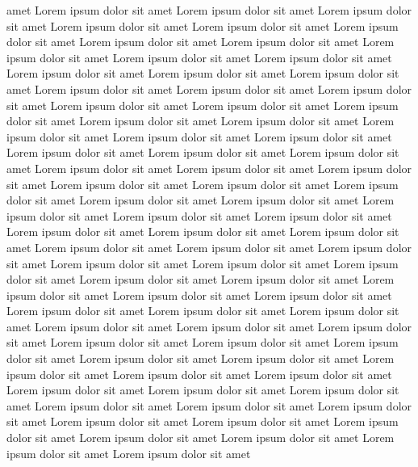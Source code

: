 amet Lorem ipsum dolor sit amet Lorem ipsum dolor sit amet Lorem ipsum
dolor sit amet Lorem ipsum dolor sit amet Lorem ipsum dolor sit amet
Lorem ipsum dolor sit amet Lorem ipsum dolor sit amet Lorem ipsum dolor
sit amet Lorem ipsum dolor sit amet Lorem ipsum dolor sit amet Lorem
ipsum dolor sit amet Lorem ipsum dolor sit amet Lorem ipsum dolor sit
amet Lorem ipsum dolor sit amet Lorem ipsum dolor sit amet Lorem ipsum
dolor sit amet Lorem ipsum dolor sit amet Lorem ipsum dolor sit amet
Lorem ipsum dolor sit amet Lorem ipsum dolor sit amet Lorem ipsum dolor
sit amet Lorem ipsum dolor sit amet Lorem ipsum dolor sit amet Lorem
ipsum dolor sit amet Lorem ipsum dolor sit amet Lorem ipsum dolor sit
amet Lorem ipsum dolor sit amet Lorem ipsum dolor sit amet Lorem ipsum
dolor sit amet Lorem ipsum dolor sit amet Lorem ipsum dolor sit amet
Lorem ipsum dolor sit amet Lorem ipsum dolor sit amet Lorem ipsum dolor
sit amet Lorem ipsum dolor sit amet Lorem ipsum dolor sit amet Lorem
ipsum dolor sit amet Lorem ipsum dolor sit amet Lorem ipsum dolor sit
amet Lorem ipsum dolor sit amet Lorem ipsum dolor sit amet Lorem ipsum
dolor sit amet Lorem ipsum dolor sit amet Lorem ipsum dolor sit amet
Lorem ipsum dolor sit amet Lorem ipsum dolor sit amet Lorem ipsum dolor
sit amet Lorem ipsum dolor sit amet Lorem ipsum dolor sit amet Lorem
ipsum dolor sit amet Lorem ipsum dolor sit amet Lorem ipsum dolor sit
amet Lorem ipsum dolor sit amet Lorem ipsum dolor sit amet Lorem ipsum
dolor sit amet Lorem ipsum dolor sit amet Lorem ipsum dolor sit amet
Lorem ipsum dolor sit amet Lorem ipsum dolor sit amet Lorem ipsum dolor
sit amet Lorem ipsum dolor sit amet Lorem ipsum dolor sit amet Lorem
ipsum dolor sit amet Lorem ipsum dolor sit amet Lorem ipsum dolor sit
amet Lorem ipsum dolor sit amet Lorem ipsum dolor sit amet Lorem ipsum
dolor sit amet Lorem ipsum dolor sit amet Lorem ipsum dolor sit amet
Lorem ipsum dolor sit amet Lorem ipsum dolor sit amet Lorem ipsum dolor
sit amet Lorem ipsum dolor sit amet Lorem ipsum dolor sit amet Lorem
ipsum dolor sit amet Lorem ipsum dolor sit amet Lorem ipsum dolor sit
amet Lorem ipsum dolor sit amet Lorem ipsum dolor sit amet
